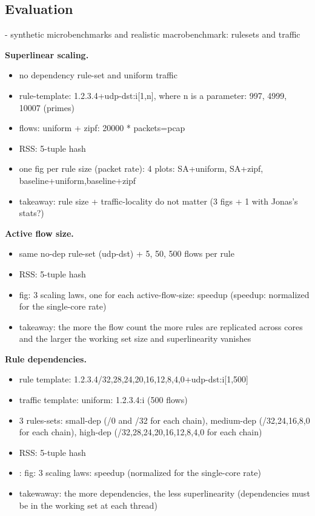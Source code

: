 \subsection{Evaluation}
\label{sec:sa-nf-tables-eval}

- synthetic microbenchmarks and realistic macrobenchmark: rulesets and traffic

\noindent%
\textbf{Superlinear scaling.} %
\begin{itemize}
\item no dependency rule-set and uniform traffic
\item rule-template: 1.2.3.4+udp-dst:i[1,n], where n is a parameter: 997, 4999, 10007 (primes)
\item flows: uniform + zipf: 20000 * packets=pcap
\item RSS: 5-tuple hash
\item one fig per rule size (packet rate): 4 plots: SA+uniform, SA+zipf, baseline+uniform,baseline+zipf
\item takeaway: rule size + traffic-locality do not matter (3 figs + 1 with Jonas's stats?)
\end{itemize}

\noindent%
\textbf{Active flow size.} %
\begin{itemize}
\item same no-dep rule-set (udp-dst) + 5, 50, 500 flows per rule
\item RSS: 5-tuple hash
\item fig: 3 scaling laws, one for each active-flow-size: speedup (speedup: normalized for the single-core rate)
\item takeaway: the more the flow count the more rules are replicated across cores and the larger the working set size and superlinearity vanishes
\end{itemize}

\noindent%
\textbf{Rule dependencies.} %
\begin{itemize}
\item rule template: 1.2.3.4/{32,28,24,20,16,12,8,4,0}+udp-dst:i[1,500]
\item   traffic template: uniform: 1.2.3.4:i (500 flows) 
\item   3 rules-sets: small-dep (/0 and /32 for each chain), medium-dep (/{32,24,16,8,0}  for each chain), high-dep (/{32,28,24,20,16,12,8,4,0}  for each chain)
\item   RSS: 5-tuple hash
\item: fig: 3 scaling laws: speedup (normalized for the single-core rate)
\item takewaway: the more dependencies, the less superlinearity (dependencies must be in the working set at each thread)
\end{itemize}

